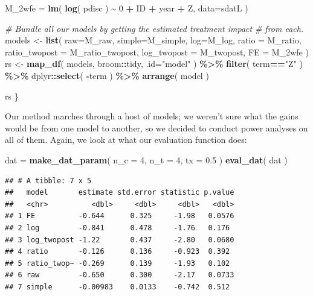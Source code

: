 \documentclass[
]{book}
\newenvironment{Shaded}{\begin{snugshade}}{\end{snugshade}}
\newcommand{\AttributeTok}[1]{\textcolor[rgb]{0.13,0.29,0.53}{#1}}
\newcommand{\CommentTok}[1]{\textcolor[rgb]{0.56,0.35,0.01}{\textit{#1}}}
\newcommand{\DecValTok}[1]{\textcolor[rgb]{0.00,0.00,0.81}{#1}}
\newcommand{\FloatTok}[1]{\textcolor[rgb]{0.00,0.00,0.81}{#1}}
\newcommand{\FunctionTok}[1]{\textcolor[rgb]{0.13,0.29,0.53}{\textbf{#1}}}
\newcommand{\NormalTok}[1]{#1}
\newcommand{\OtherTok}[1]{\textcolor[rgb]{0.56,0.35,0.01}{#1}}
\newcommand{\SpecialCharTok}[1]{\textcolor[rgb]{0.81,0.36,0.00}{\textbf{#1}}}
\newcommand{\StringTok}[1]{\textcolor[rgb]{0.31,0.60,0.02}{#1}}
\begin{document}
\begin{Shaded}
\begin{Highlighting}[]
\NormalTok{    M\_2wfe }\OtherTok{=} \FunctionTok{lm}\NormalTok{( }\FunctionTok{log}\NormalTok{( pdisc ) }\SpecialCharTok{\textasciitilde{}} \DecValTok{0} \SpecialCharTok{+}\NormalTok{ ID }\SpecialCharTok{+}\NormalTok{ year }\SpecialCharTok{+}\NormalTok{ Z,}
                 \AttributeTok{data=}\NormalTok{sdatL )}

    \CommentTok{\# Bundle all our models by getting the estimated treatment impact}
    \CommentTok{\# from each.}
\NormalTok{    models }\OtherTok{\textless{}{-}} \FunctionTok{list}\NormalTok{( }\AttributeTok{raw=}\NormalTok{M\_raw, }\AttributeTok{simple=}\NormalTok{M\_simple,}
                       \AttributeTok{log=}\NormalTok{M\_log, }\AttributeTok{ratio =}\NormalTok{ M\_ratio, }
                       \AttributeTok{ratio\_twopost =}\NormalTok{ M\_ratio\_twopost,}
                       \AttributeTok{log\_twopost =}\NormalTok{ M\_twopost, }
                       \AttributeTok{FE =}\NormalTok{ M\_2wfe )}
\NormalTok{    rs }\OtherTok{\textless{}{-}} \FunctionTok{map\_df}\NormalTok{( models, broom}\SpecialCharTok{::}\NormalTok{tidy, }\AttributeTok{.id=}\StringTok{"model"}\NormalTok{ ) }\SpecialCharTok{\%\textgreater{}\%}
        \FunctionTok{filter}\NormalTok{( term}\SpecialCharTok{==}\StringTok{"Z"}\NormalTok{ ) }\SpecialCharTok{\%\textgreater{}\%}
\NormalTok{        dplyr}\SpecialCharTok{::}\FunctionTok{select}\NormalTok{( }\SpecialCharTok{{-}}\NormalTok{term ) }\SpecialCharTok{\%\textgreater{}\%}
      \FunctionTok{arrange}\NormalTok{( model )}
    
\NormalTok{    rs}
\NormalTok{\}}
\end{Highlighting}
\end{Shaded}

Our method marches through a host of models; we weren't sure what the gains would be from one model to another, so we decided to conduct power analyses on all of them.
Again, we look at what our evaluation function does:

\begin{Shaded}
\begin{Highlighting}[]
\NormalTok{dat }\OtherTok{=} \FunctionTok{make\_dat\_param}\NormalTok{( }\AttributeTok{n\_c =} \DecValTok{4}\NormalTok{, }\AttributeTok{n\_t =} \DecValTok{4}\NormalTok{, }\AttributeTok{tx =} \FloatTok{0.5}\NormalTok{ )}
\FunctionTok{eval\_dat}\NormalTok{( dat )}
\end{Highlighting}
\end{Shaded}

\begin{verbatim}
## # A tibble: 7 x 5
##   model       estimate std.error statistic p.value
##   <chr>          <dbl>     <dbl>     <dbl>   <dbl>
## 1 FE          -0.644      0.325     -1.98   0.0576
## 2 log         -0.841      0.478     -1.76   0.176 
## 3 log_twopost -1.22       0.437     -2.80   0.0680
## 4 ratio       -0.126      0.136     -0.923  0.392 
## 5 ratio_twop~ -0.269      0.139     -1.93   0.102 
## 6 raw         -0.650      0.300     -2.17   0.0733
## 7 simple      -0.00983    0.0133    -0.742  0.512
\end{verbatim}
\end{document}
